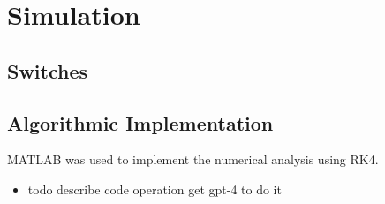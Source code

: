 \section{Simulation}
\subsection{Switches}
\subsection{Algorithmic Implementation}
MATLAB was used to implement the numerical analysis using RK4.
\begin{itemize}
	\item todo describe code operation get gpt-4 to do it
\end{itemize}


\pagebreak 
\pagebreak 
\pagebreak 
\pagebreak 